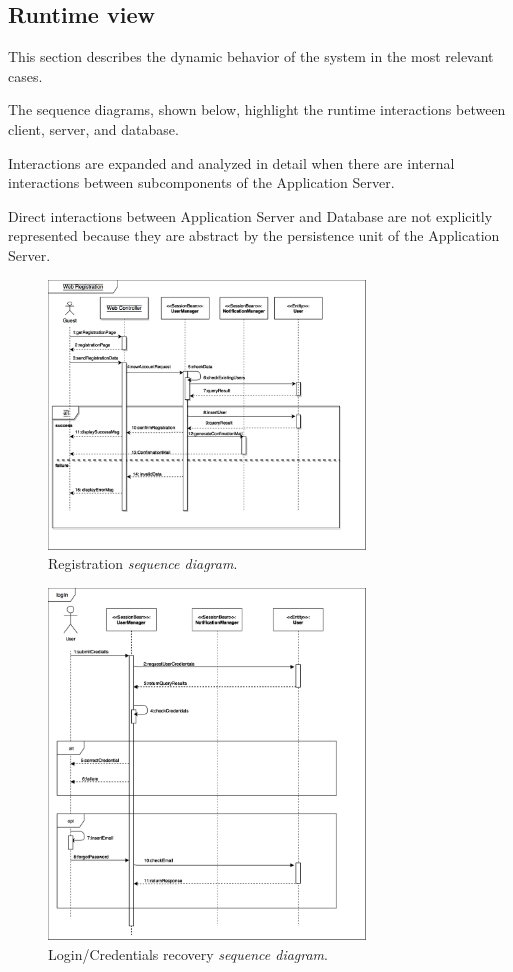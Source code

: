 \documentclass{article}
\begin{document}
	\newpage
	\subsection{Runtime view}
	This section describes the dynamic behavior of the system in the most relevant cases.

	The sequence diagrams, shown below, highlight the runtime interactions between client, server, and database.
	
	\bigskip
	Interactions are expanded and analyzed in detail when there are internal interactions between subcomponents of the Application Server.
	
	Direct interactions between Application Server and Database are not explicitly represented because they are abstract by the persistence unit of the Application Server.

	\bigskip
	\begin{figure}[!ht]
	\centering
	\includegraphics[width=0.75\textwidth]{img/diagrams/sd_registration.png}
	\caption{Registration \textit{sequence diagram}.}
	\end{figure}

	\newpage
	\begin{figure}[!ht]
	\centering
	\includegraphics[width=0.75\textwidth]{img/diagrams/sd_login.png}
	\caption{Login/Credentials recovery \textit{sequence diagram}.}
	\end{figure}
\end{document}
